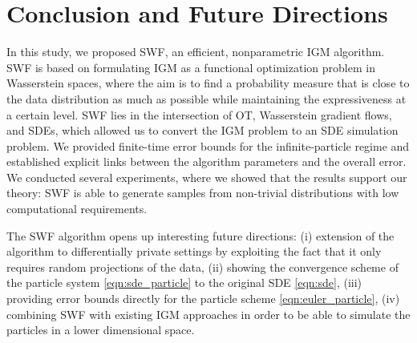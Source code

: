 
\section{Conclusion and Future Directions}

In this study, we proposed SWF, an efficient, nonparametric IGM algorithm. 
SWF is based on formulating IGM as a functional optimization problem in Wasserstein spaces, where the aim is to find a probability measure that is close to the data distribution as much as possible while maintaining the expressiveness at a certain level. 
SWF lies in the intersection of OT, Wasserstein gradient flows, and SDEs, which allowed us to convert the IGM problem to an SDE simulation problem. We provided finite-time error bounds for the infinite-particle regime and established explicit links between the algorithm parameters and the overall error. 
%
We conducted several experiments, where we showed that the results support our theory: SWF is able to generate samples from non-trivial distributions with low computational requirements. 

The SWF algorithm opens up interesting future directions: (i) extension of the algorithm to differentially private settings \cite{dwork2014algorithmic} by exploiting the fact that it only requires random projections of the data, (ii) showing the convergence scheme of the particle system \eqref{eqn:sde_particle} to the original SDE \eqref{eqn:sde}, (iii) providing error bounds directly for the particle scheme \eqref{eqn:euler_particle}, (iv) combining SWF with existing IGM approaches in order to be able to simulate the particles in a lower dimensional space.  
 